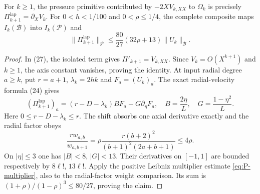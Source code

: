 \begin{proposition}
\label{prop:lap-pressure-shifted}
For $k\ge1$, the pressure primitive contributed by
$-2XV_{k,XX}$ to $\Omega_k$ is precisely
$\Pi_{k+1}^{\mathrm{lap}}=\partial_XV_k$.
For $0<h<1/100$ and $0<\rho\le1/4$, the complete composite maps
$I_k(\mathcal B)$ into $I_k(\mathcal P)$ and
\begin{equation}\label{eq:lap-pressure-shifted-bound}
\|\Pi_{k+1}^{\mathrm{lap}}\|_{\mathcal P}
\le\frac{80}{27}(32\rho+13)\|U_k\|_{\mathcal B}.
\end{equation}
\end{proposition}
\begin{proof}
In (27), the isolated term gives
$\Pi'_{k+1}=V_{k,XX}$. Since $V_k=O(X^{k+1})$
and $k\ge1$, the axis constant vanishes, proving the
identity. At input radial degree $a\ge k$, put
$r=a+1$, $\lambda_k=2hk$ and $F_a=(U_k)_a$.
The exact radial-velocity formula (24) gives
\[
(\Pi_{k+1}^{\mathrm{lap}})_a
=(r-D-\lambda_k)BF_a-G\partial_\eta F_a,
\quad B=\frac{2\eta}{L},\quad G=\frac{1-\eta^2}{L}.
\]
Here $0\le r-D-\lambda_k\le r$. The shift absorbs
one axial derivative exactly and the radial factor obeys
\[
\frac{r w_{a,b}}{w_{a,b+1}}
=\rho\frac{r(b+2)^2}{(b+1)^2(2a+b+1)}
\le4\rho.
\]
On $|\eta|\le3$ one has $|B|<8$, $|G|<13$.
Their derivatives on $[-1,1]$ are bounded respectively
by $8\ell!$, $13\ell!$. Apply the positive Leibniz
multiplier estimate \eqref{eq:P-multiplier}, also to the
radial-factor weight comparison. Its sum is
$(1+\rho)/(1-\rho)^3\le80/27$, proving the claim.
\end{proof}

